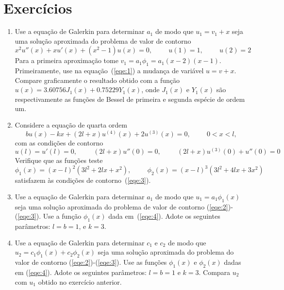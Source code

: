 \documentclass[10pt,a4paper]{article}
\begin{document}
	\section{Exercícios}
	\begin{enumerate}
		\item Use a equação de Galerkin para determinar $a_1$ de modo que $u_1=v_1+x$ seja uma solução aproximada do problema de valor de contorno
	\begin{equation}
		x^2u''(x) + xu'(x)+(x^2-1)u(x)=0, \hspace{1cm} u(1)=1, \hspace{1cm} u(2)=2
		\label{eqe:1}
	\end{equation}
	Para a primeira aproximação tome $v_1=a_1\phi_1=a_1(x-2)(x-1)$. Primeiramente, use na equação~(\ref{eqe:1}) a mudança de variável $u=v+x$. Compare graficamente o resultado obtido com a função $u(x)=3.60756J_1(x)+0.75229Y_1(x)$, onde $J_1(x)$ e $Y_1(x)$ são respectivamente as funções de Bessel de primeira e segunda espécie de ordem um.
	
		\item Considere a equação de quarta ordem
	\begin{equation}
		bu(x)-kx+(2l+x)u^{(4)}(x)+2u^{(3)}(x) = 0, \hspace{1cm}0<x<l,
		\label{eqe:2}
	\end{equation}
	com as condições de contorno
	\begin{equation}
		u(l) = u'(l)=0,\hspace{1cm} (2l+x)u''(0)=0, \hspace{1cm} (2l+x)u^{(3)}(0)+u''(0)=0
		\label{eqe:3}
	\end{equation}
	Verifique que as funções teste
	\begin{equation}
		\phi_1(x) = (x-l)^2(3l^2+2lx+x^2), \hspace{1cm} \phi_2(x)=(x-l)^3(3l^2+4lx+3x^2)
		\label{eqe:4}
	\end{equation}
	satisfazem às condições de contorno~(\ref{eqe:3}).
	
		\item Use a equação de Galerkin para determinar $a_1$ de modo que $u_1=a_1\phi_1(x)$ seja uma solução aproximada do problema de valor de contorno (\ref{eqe:2})-(\ref{eqe:3}). Use a função $\phi_1(x)$ dada em~(\ref{eqe:4}). Adote os seguintes parâmetros: $l=b=1$, e $k=3$.
	
		\item Use a equação de Galerkin para determinar $c_1$ e $c_2$ de modo que $u_2=c_1\phi_1(x)+c_2\phi_2(x)$ seja uma solução aproximada do problema do valor de contorno (\ref{eqe:2})-(\ref{eqe:3}). Use as funções $\phi_1(x)$ e $\phi_2(x)$ dadas em (\ref{eqe:4}). Adote os seguintes parâmetros: $l=b=1$ e $k=3$. Compara $u_2$ com $u_1$ obtido no exercício anterior.
	\end{enumerate}
\end{document}
